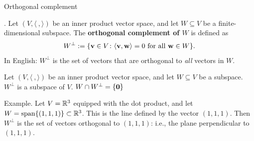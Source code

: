 \begin{frame}{Orthogonal complement}
\begin{definition}. 
 Let $(V,\langle \ , \rangle)$ be an inner product vector space, and let $W\subseteq V$ be a finite-dimensional subspace. 
 The {\bf orthogonal complement of $W$} is defined as 
\[
W^\perp:=\{{\mathbf v}\in V\colon \langle {\mathbf v}, {\mathbf w}\rangle=0 \text{ for all }{\mathbf w}\in W\}.
\]
In English: $W^\perp$ is the set of vectors that are orthogonal to {\em all} vectors in $W$. 
\end{definition}
\pause
\begin{theorem}
Let $(V,\langle \ , \rangle)$ be an inner product vector space, and let $W\subseteq V$ be a subspace. 
\bb[(a)]
\ii $W^\perp$ is a subspace of $V$. 
\ii $W\cap W^\perp=\{{\mathbf 0}\}$
\ee
\end{theorem}
\pause 
\alert{Example}. Let $V={\mathbb R}^3$ equipped with the dot product, and let $W=\operatorname{span}\{(1,1,1)\}\subset {\mathbb R}^3$. This is the line defined by the vector $(1,1,1)$. Then $W^\perp$ is the set of vectors orthogonal to $(1,1,1)$: i.e., the plane perpendicular to $(1,1,1)$. 
\end{frame}

